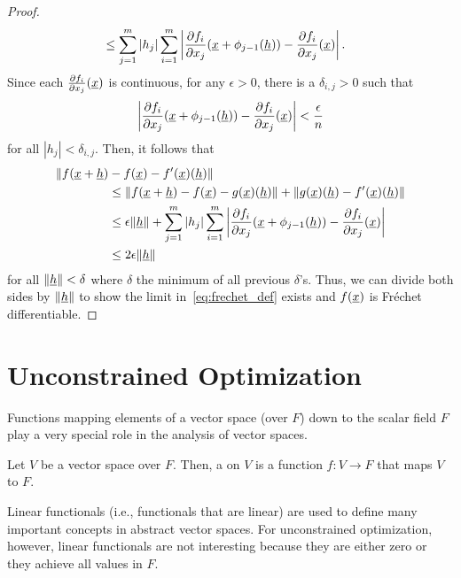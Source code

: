 \begin{proof}
\begin{align*}
&\leq \sum_{j=1}^m |h_j| \sum_{i=1}^m \left| \frac{\partial f_i}{\partial x_j} (\underline{x}+\phi_{j-1}(\underline{h})) - \frac{\partial f_i}{\partial x_j} (\underline{x}) \right|.
\end{align*}
Since each $\frac{\partial f_i}{\partial x_j} (\underline{x})$ is continuous, for any $\epsilon>0$, there is a $\delta_{i,j}>0$ such that
\[ \left| \frac{\partial f_i}{\partial x_j} (\underline{x}+\phi_{j-1}(\underline{h})) - \frac{\partial f_i}{\partial x_j} (\underline{x}) \right| < \frac{\epsilon}{n} \]
for all $|h_j| < \delta_{i,j}$.
Then, it follows that
\begin{align*}
\| f(\underline{x}+\underline{h}) & - f(\underline{x}) - f'(\underline{x}) (\underline{h}) \|  \\ &\leq \| f(\underline{x}+\underline{h}) - f(\underline{x}) - g(\underline{x}) (\underline{h}) \| + \| g(\underline{x})(\underline{h}) - f'(\underline{x}) (\underline{h}) \| \\
&\leq \epsilon \|\underline{h}\| + \sum_{j=1}^m |h_j| \sum_{i=1}^m \left| \frac{\partial f_i}{\partial x_j} (\underline{x}+\phi_{j-1}(\underline{h})) - \frac{\partial f_i}{\partial x_j} (\underline{x}) \right| \\
&\leq  2 \epsilon \| \underline{h} \| 
\end{align*}
for all $\| \underline{h} \| < \delta$ where $\delta$ the minimum of all previous $\delta$'s.
Thus, we can divide both sides by $\|\underline{h}\|$ to show the limit in~\eqref{eq:frechet_def} exists and $f(\underline{x})$ is Fr\'{e}chet differentiable.
\end{proof}
\fi


\section{Unconstrained Optimization}

Functions mapping elements of a vector space (over $F$) down to the scalar field $F$ play a very special role in the analysis of vector spaces.

\begin{definition}
Let $V$ be a vector space over $F$.
Then, a  on $V$ is a function $f \colon V \rightarrow F$ that maps $V$ to $F$.
\end{definition}

Linear functionals (i.e., functionals that are linear) are used to define many important concepts in abstract vector spaces.
For unconstrained optimization, however, linear functionals are not interesting because they are either zero or they achieve all values in $F$.

